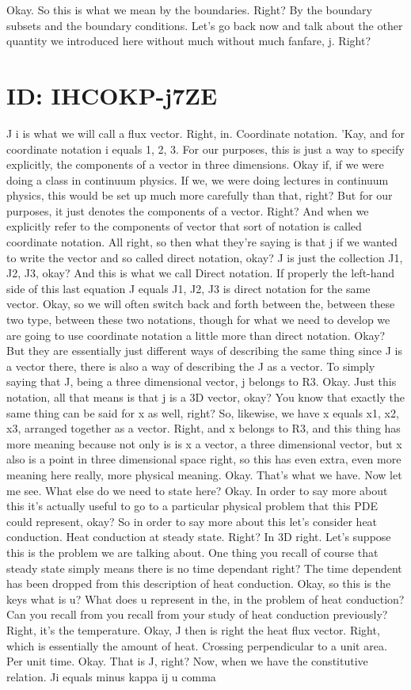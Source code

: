 \documentclass[10pt]{article}
\begin{document}
Okay. So this is what we mean by the boundaries. Right? By the boundary subsets and the boundary conditions. Let's go back now and talk about the other quantity we introduced here without much without much fanfare, j. Right?

\section*{ID: IHCOKP-j7ZE}
J i is what we will call a flux vector. Right, in. Coordinate notation. 'Kay, and for coordinate notation i equals 1, 2, 3. For our purposes, this is just a way to specify explicitly, the components of a vector in three dimensions. Okay if, if we were doing a class in continuum physics. If we, we were doing lectures in continuum physics, this would be set up much more carefully than that, right? But for our purposes, it just denotes the components of a vector. Right? And when we explicitly refer to the components of vector that sort of notation is called coordinate notation. All right, so then what they're saying is that j if we wanted to write the vector and so called direct notation, okay? J is just the collection J1, J2, J3, okay? And this is what we call Direct notation. If properly the left-hand side of this last equation J equals J1, J2, J3 is direct notation for the same vector. Okay, so we will often switch back and forth between the, between these two type, between these two notations, though for what we need to develop we are going to use coordinate notation a little more than direct notation. Okay? But they are essentially just different ways of describing the same thing since J is a vector there, there is also a way of describing the J as a vector. To simply saying that J, being a three dimensional vector, j belongs to R3. Okay. Just this notation, all that means is that j is a 3D vector, okay? You know that exactly the same thing can be said for x as well, right? So, likewise, we have x equals x1, x2, x3, arranged together as a vector. Right, and x belongs to R3, and this thing has more meaning because not only is is x a vector, a three dimensional vector, but x also is a point in three dimensional space right, so this has even extra, even more meaning here really, more physical meaning. Okay. That's what we have. Now let me see. What else do we need to state here? Okay. In order to say more about this it's actually useful to go to a particular physical problem that this PDE could represent, okay? So in order to say more about this let's consider heat conduction. Heat conduction at steady state. Right? In 3D right. Let's suppose this is the problem we are talking about. One thing you recall of course that steady state simply means there is no time dependant right? The time dependent has been dropped from this description of heat conduction. Okay, so this is the keys what is u? What does u represent in the, in the problem of heat conduction? Can you recall from you recall from your study of heat conduction previously? Right, it's the temperature. Okay, J then is right the heat flux vector. Right, which is essentially the amount of heat. Crossing perpendicular to a unit area. Per unit time. Okay. That is J, right? Now, when we have the constitutive relation. Ji equals minus kappa ij u comma 
\end{document}
